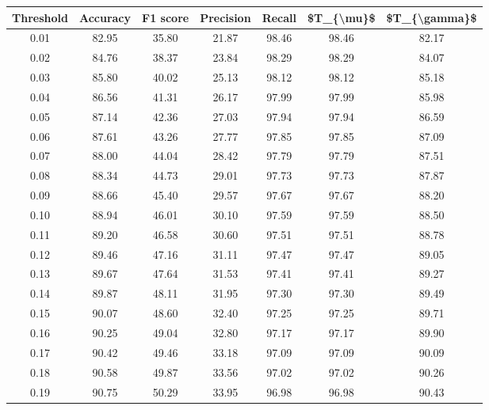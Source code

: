 \begin{tabular}{|c|c|c|c|c|c|c|}
\hline
 Threshold &  Accuracy &  F1 score &  Precision &  Recall &  \$T\_\{\textbackslash mu\}\$ &  \$T\_\{\textbackslash gamma\}\$ \\
\hline
      0.01 &     82.95 &     35.80 &      21.87 &   98.46 &      98.46 &         82.17 \\
      0.02 &     84.76 &     38.37 &      23.84 &   98.29 &      98.29 &         84.07 \\
      0.03 &     85.80 &     40.02 &      25.13 &   98.12 &      98.12 &         85.18 \\
      0.04 &     86.56 &     41.31 &      26.17 &   97.99 &      97.99 &         85.98 \\
      0.05 &     87.14 &     42.36 &      27.03 &   97.94 &      97.94 &         86.59 \\
      0.06 &     87.61 &     43.26 &      27.77 &   97.85 &      97.85 &         87.09 \\
      0.07 &     88.00 &     44.04 &      28.42 &   97.79 &      97.79 &         87.51 \\
      0.08 &     88.34 &     44.73 &      29.01 &   97.73 &      97.73 &         87.87 \\
      0.09 &     88.66 &     45.40 &      29.57 &   97.67 &      97.67 &         88.20 \\
      0.10 &     88.94 &     46.01 &      30.10 &   97.59 &      97.59 &         88.50 \\
      0.11 &     89.20 &     46.58 &      30.60 &   97.51 &      97.51 &         88.78 \\
      0.12 &     89.46 &     47.16 &      31.11 &   97.47 &      97.47 &         89.05 \\
      0.13 &     89.67 &     47.64 &      31.53 &   97.41 &      97.41 &         89.27 \\
      0.14 &     89.87 &     48.11 &      31.95 &   97.30 &      97.30 &         89.49 \\
      0.15 &     90.07 &     48.60 &      32.40 &   97.25 &      97.25 &         89.71 \\
      0.16 &     90.25 &     49.04 &      32.80 &   97.17 &      97.17 &         89.90 \\
      0.17 &     90.42 &     49.46 &      33.18 &   97.09 &      97.09 &         90.09 \\
      0.18 &     90.58 &     49.87 &      33.56 &   97.02 &      97.02 &         90.26 \\
      0.19 &     90.75 &     50.29 &      33.95 &   96.98 &      96.98 &         90.43 \\

\end{tabular}
